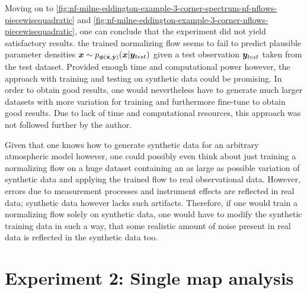 \documentclass[a4paper,12pt]{report}
\def\lk#1{{\color{black}{#1}}}
\begin{document}
Moving on to \cref{fig:nf-milne-eddington-example-3-corner-spectrum-nf-nflows-piecewisequadratic} and \cref{fig:nf-milne-eddington-example-3-corner-nflows-piecewisequadratic}, one can conclude that the experiment did not yield satisfactory results. \lk{This is to say that} the trained normalizing flow seems to fail to predict plausible parameter densities $\bm{x} \sim p_{\bm{\phi}(\hat{\boldsymbol{\mathbf{x}}}, \hat{\boldsymbol{\mathbf{y}}})}(\bm{x}|\bm{y}_{test})$ given a test observation $\bm{y}_{test}$ taken from the test dataset. Provided enough time and computational power however, the approach with training and testing on synthetic data could be promising. In order to obtain good results, one would nevertheless have to generate much larger datasets with more variation for training and furthermore fine-tune \lk{the hyperparameters in order} to obtain good results. Due to lack of time and computational resources, this approach was not followed further by the author. 

Given that one knows how to generate synthetic data for an arbitrary atmospheric model however, one could possibly even think about just training a normalizing flow on a huge dataset containing an as large as possible variation of synthetic data and applying the trained flow to real observational data. However, errors due to measurement processes and instrument effects are reflected in real data; synthetic data however lacks such artifacts. Therefore, if one would train a normalizing flow solely on synthetic data, one would have to modify the synthetic training data in such a way, that some realistic amount of noise present in real data is reflected in the synthetic data too.

\section{Experiment 2: Single map analysis}
\end{document}
